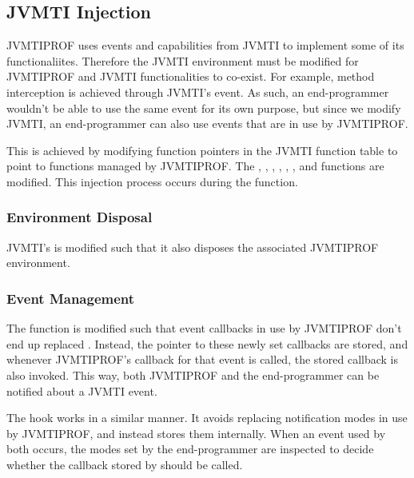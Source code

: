 \subsection{JVMTI Injection}

JVMTIPROF uses events and capabilities from JVMTI to implement some of its functionaliites. Therefore the JVMTI environment must be modified for JVMTIPROF and JVMTI functionalities to co-exist. For example, method interception is achieved through JVMTI's  event. As such, an end-programmer wouldn't be able to use the same event for its own purpose, but since we modify JVMTI, an end-programmer can also use events that are in use by JVMTIPROF.

This is achieved by modifying function pointers in the JVMTI function table to point to functions managed by JVMTIPROF. The , , , , , ,  and  functions are modified. This injection process occurs during the  function.

\subsubsection*{Environment Disposal}

JVMTI's  is modified such that it also disposes the associated JVMTIPROF environment.

\subsubsection*{Event Management}

The  function is modified such that event callbacks in use by JVMTIPROF don't end up replaced . Instead, the pointer to these newly set callbacks are stored, and whenever JVMTIPROF's callback for that event is called, the stored callback is also invoked. This way, both JVMTIPROF and the end-programmer can be notified about a JVMTI event.

The  hook works in a similar manner. It avoids replacing notification modes in use by JVMTIPROF, and instead stores them internally. When an event used by both occurs, the modes set by the end-programmer are inspected to decide whether the callback stored by  should be called.

